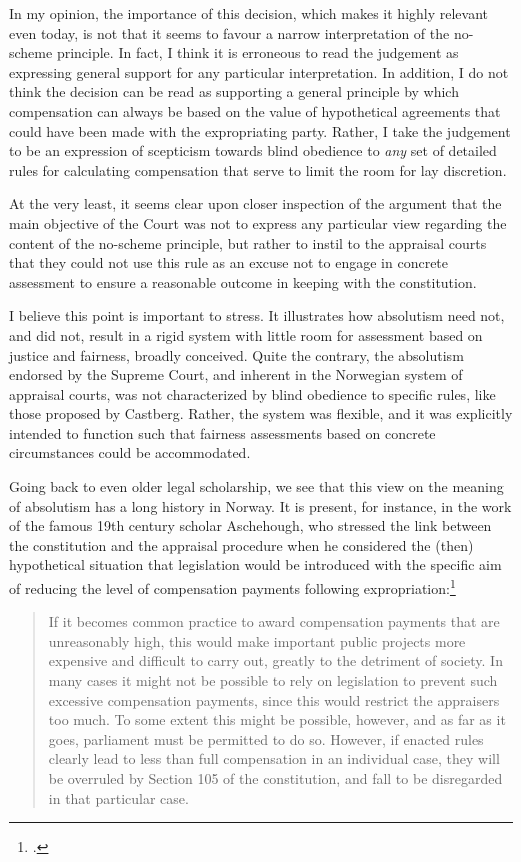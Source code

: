 In my opinion, the importance of this decision, which makes it highly relevant even today, is not that it seems to favour a narrow interpretation of the no-scheme principle. In fact, I think it is erroneous to read the judgement as expressing general support for any particular interpretation. In addition, I do not think the decision can be read as supporting a general principle by which compensation can always be based on the value of hypothetical agreements that could have been made with the expropriating party. Rather, I take the judgement to be an expression of scepticism towards blind obedience to \emph{any} set of detailed rules for calculating compensation that serve to limit the room for lay discretion.

At the very least, it seems clear upon closer inspection of the argument that the main objective of the Court was not to express any particular view regarding the content of the no-scheme principle, but rather to instil to the appraisal courts that they could not use this rule as an excuse not to engage in concrete assessment to ensure a reasonable outcome in keeping with the constitution.

I believe this point is important to stress. It illustrates how absolutism need not, and did not, result in a rigid system with little room for assessment based on justice and fairness, broadly conceived. Quite the contrary, the absolutism endorsed by the Supreme Court, and inherent in the Norwegian system of appraisal courts, was not characterized by blind obedience to specific rules, like those proposed by Castberg. Rather, the system was flexible, and it was explicitly intended to function such that fairness assessments based on concrete circumstances could be accommodated. 

Going back to even older legal scholarship, we see that this view on the meaning of absolutism has a long history in Norway. It is present, for instance, in the work of the famous 19th century scholar Aschehough, who stressed the link between the constitution and the appraisal procedure when he considered the (then) hypothetical situation that legislation would be introduced with the specific aim of reducing the level of compensation payments following expropriation:\footcite[48]{aschehough93} 

\begin{quote}
If it becomes common practice to award compensation payments that are unreasonably high, this would make important public projects more expensive and difficult to carry out, greatly to the detriment of society. In many cases it might not be possible to rely on legislation to prevent such excessive compensation payments, since this would restrict the appraisers too much. To some extent this might be possible, however, and as far as it goes, parliament must be permitted to do so. However, if enacted rules clearly lead to less than full compensation in an individual case, they will be overruled by Section 105 of the constitution, and fall to be disregarded in that particular case.
\end{quote}

